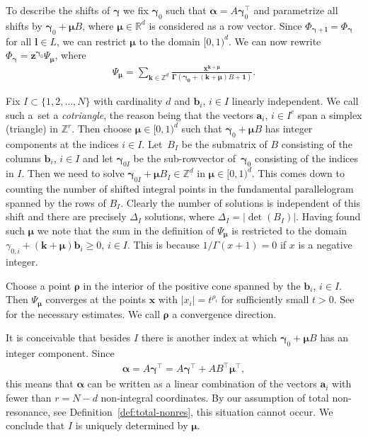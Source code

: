 \documentclass[11pt]{article}
\numberwithin{equation}{section}
\numberwithin{equation}{section}
\begin{document}
To describe the shifts of $\bm\gamma$ we fix $\bm\gamma_0$ such that $\bm\alpha
=A\bm\gamma_0^{\intercal}$ and parametrize all shifts by $\bm\gamma_0+\bm\mu B$, where $\bm\mu
\in\mathbb{R}^d$ is considered as a row vector. Since $\Phi_{\bm\gamma+\bm{l}}=\Phi_{\bm\gamma}$
for all $\bm{l}\in L$, we can restrict $\bm\mu$ to the domain $[0,1)^d$. We can
now rewrite $\Phi_{\bm\gamma}=\bm{z}^{\bm\gamma_0}\Psi_{\bm\mu}$, where
\begin{gather*}
\Psi_{\bm\mu}=\sum_{\bm{k}\in\mathbb{Z}^d}\frac{\bm{x}^{\bm{k}+\bm\mu}}
{\bm{\Gamma}(\bm{\gamma_0} + (\bm{k}+\bm\mu)B + \bm{1}) }.
\end{gather*}

Fix $I\subset\{1,2,\dots,N\}$ with cardinality $d$ and $\bm{b}_i$, $i\in I$ linearly
independent. We call such a~set a {\it cotriangle}, the reason being that
the vectors $\bm{a}_i$, $i\in I^c$ span a simplex (triangle) in $\mathbb{Z}^r$.
Then choose $\bm\mu\in[0,1)^d$ such that $\bm\gamma_0+\bm\mu B$ has integer components at the indices $i\in I$. Let~$B_I$ be the submatrix of $B$ consisting of the
columns $\bm{b}_i$, $i\in I$ and let $\bm\gamma_{0I}$ be the sub-rowvector of~$\bm{\gamma}_0$ consisting of the indices in $I$. Then we need to solve $\bm\gamma_{0I}+\bm\mu B_I\in\mathbb{Z}^d$ in $\bm\mu\in
[0,1)^d$. This comes down to counting the number of shifted integral points in the fundamental
parallelogram spanned by the rows of $B_I$. Clearly the number of solutions is independent of this shift and there are precisely $\Delta_I$ solutions, where $\Delta_I=|\det(B_I)|$. Having found such $\bm\mu$ we note that the sum in
the definition of $\Psi_{\bm\mu}$ is restricted to the domain $\gamma_{0,i}+(\bm{k}+\bm\mu)
\bm{b}_i\ge0$, $i\in I$. This is because $1/\Gamma(x+1)=0$ if $x$ is a negative integer.

Choose a point $\bm\rho$ in the interior of the positive cone spanned by the $\bm{b}_i$, $i\in I$.
Then $\Psi_{\bm\mu}$ converges at the points $\bm{x}$ with $|x_i|=t^{\rho_i}$ for
sufficiently small $t>0$. See \cite{Beu11} for the necessary estimates.
We call $\bm\rho$ a convergence direction.

It is conceivable that besides $I$ there is another index at which $\bm\gamma_0+\bm\mu B$ has
an integer component. Since
\begin{gather*}
\bm\alpha=A\bm\gamma^\intercal=A\bm\gamma^\intercal+AB^\intercal\bm\mu^\intercal,
\end{gather*}
this means that $\bm\alpha$ can be written as a linear combination of the vectors $\bm{a}_i$
with fewer than $r=N-d$ non-integral coordinates. By our assumption of total non-resonance,
see Definition~\ref{def:total-nonres}, this situation cannot occur. We conclude that $I$
is uniquely determined by $\bm\mu$.
\end{document}
